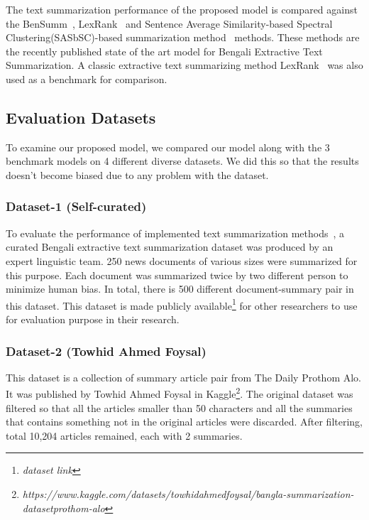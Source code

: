 The text summarization performance of the proposed model is compared against
the BenSumm~\cite{chowdhury-etal-2021-tfidf-clustering}, LexRank~\cite{Erkan-lexRank-2004} and Sentence
Average Similarity-based Spectral Clustering(SASbSC)-based summarization
method~\cite{roychowdhury-etal-2022-spectral-base} methods.
These methods are the recently published state of the art model for Bengali Extractive Text Summarization.
A classic extractive text summarizing method LexRank~\cite{Erkan-lexRank-2004} was also used as a benchmark for comparison.

\subsection{Evaluation Datasets}\label{subsec:evaluation-datasets}
To examine our proposed model, we compared our model along with the 3 benchmark models on 4 different diverse datasets.
We did this so that the results doesn't become biased due to any problem with the dataset.

\subsubsection{Dataset-1 (Self-curated)}
To evaluate the performance of implemented text summarization
methods~\cite{chowdhury-etal-2021-tfidf-clustering,Erkan-lexRank-2004,roychowdhury-etal-2022-spectral-base},
a curated Bengali extractive text summarization dataset was produced by an expert linguistic team.
250 news documents of various sizes were summarized for this purpose.
Each document was summarized twice by two different person to minimize human bias.
In total, there is 500 different document-summary pair in this dataset.
This dataset is made publicly available\footnote{\textit{dataset link}} for other researchers to use for evaluation
purpose in their research.

\subsubsection{Dataset-2 (Towhid Ahmed Foysal)}
This dataset is a collection of summary article pair from The Daily Prothom Alo.
It was published by Towhid Ahmed Foysal in
Kaggle\footnote{\textit{https://www.kaggle.com/datasets/towhidahmedfoysal/bangla-summarization-datasetprothom-alo}}.
The original dataset was filtered so that all the articles smaller than 50 characters and all the summaries
that contains something not in the original articles were discarded.
After filtering, total 10,204 articles remained, each with 2 summaries.


